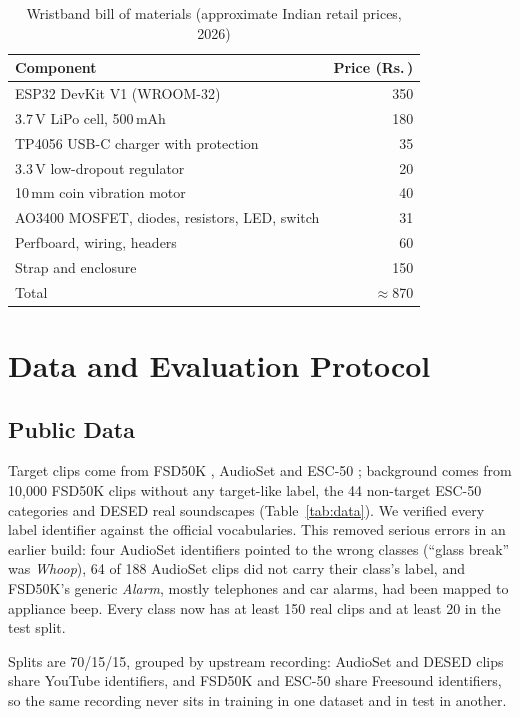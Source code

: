 \documentclass{svproc}
\newcommand{\INR}{Rs.\,}
\begin{document}
\begin{table}[t]
\caption{Wristband bill of materials (approximate Indian retail prices, 2026)}
\label{tab:bom}
\centering
\begin{tabular}{@{}lr@{}}
\toprule
Component & Price (\INR) \\
\midrule
ESP32 DevKit V1 (WROOM-32) & 350 \\
3.7\,V LiPo cell, 500\,mAh & 180 \\
TP4056 USB-C charger with protection & 35 \\
3.3\,V low-dropout regulator & 20 \\
10\,mm coin vibration motor & 40 \\
AO3400 MOSFET, diodes, resistors, LED, switch & 31 \\
Perfboard, wiring, headers & 60 \\
Strap and enclosure & 150 \\
\midrule
Total & $\approx$870 \\
\bottomrule
\end{tabular}
\end{table}

\section{Data and Evaluation Protocol}\label{sec:data}
\subsection{Public Data}
Target clips come from FSD50K \cite{fonseca2022}, AudioSet \cite{gemmeke2017} and ESC-50 \cite{piczak2015}; background comes from 10,000 FSD50K clips without any target-like label, the 44 non-target ESC-50 categories and DESED real soundscapes \cite{turpault2019} (Table~\ref{tab:data}). We verified every label identifier against the official vocabularies. This removed serious errors in an earlier build: four AudioSet identifiers pointed to the wrong classes (``glass break'' was \textit{Whoop}), 64 of 188 AudioSet clips did not carry their class's label, and FSD50K's generic \textit{Alarm}, mostly telephones and car alarms, had been mapped to appliance beep. Every class now has at least 150 real clips and at least 20 in the test split.

Splits are 70/15/15, grouped by upstream recording: AudioSet and DESED clips share YouTube identifiers, and FSD50K and ESC-50 share Freesound identifiers, so the same recording never sits in training in one dataset and in test in another.
\end{document}
